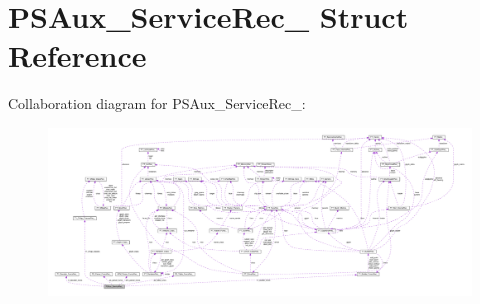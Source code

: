 \hypertarget{structPSAux__ServiceRec__}{}\section{P\+S\+Aux\+\_\+\+Service\+Rec\+\_\+ Struct Reference}
\label{structPSAux__ServiceRec__}


Collaboration diagram for P\+S\+Aux\+\_\+\+Service\+Rec\+\_\+\+:
\nopagebreak
\begin{figure}[H]
\begin{center}
\leavevmode
\includegraphics[width=350pt]{structPSAux__ServiceRec____coll__graph}
\end{center}
\end{figure}
